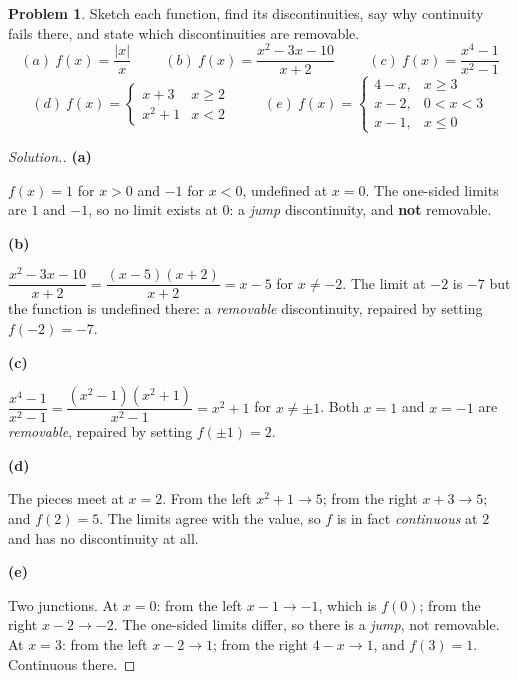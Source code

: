 \documentclass[11pt,a4paper]{article}
\theoremstyle{definition}
\newtheorem{problemx}{Problem}[subsection]
\newenvironment{problem}{\begin{problemx}}{\end{problemx}}
\newenvironment{solution}
  {\renewcommand{\qedsymbol}{}\begin{proof}[\textit{Solution}.]}
  {\end{proof}}
\newcommand{\subhead}[1]{%
  \par\medskip\noindent\textbf{#1}\par\nobreak\smallskip}
\begin{document}
\begin{problem}
Sketch each function, find its discontinuities, say why continuity fails there,
and state which discontinuities are removable.
$$(a)\ f(x) = \frac{\left|x\right|}{x}\hspace{1cm}
(b)\ f(x) = \frac{x^2-3x-10}{x+2}\hspace{1cm}
(c)\ f(x) = \frac{x^4-1}{x^2-1}$$
$$(d)\ f(x) = \begin{cases} x+3 & x\geq 2\\ x^2+1 & x<2\end{cases}
\hspace{1cm}
(e)\ f(x) = \begin{cases} 4-x, & x\geq 3\\ x-2, & 0<x<3\\ x-1, & x\leq 0\end{cases}$$
\end{problem}
\begin{solution}
\subhead{(a)}
$f(x) = 1$ for $x>0$ and $-1$ for $x<0$, undefined at $x=0$. The one-sided
limits are $1$ and $-1$, so no limit exists at $0$: a \emph{jump}
discontinuity, and \textbf{not} removable.

\subhead{(b)}
$\dfrac{x^2-3x-10}{x+2} = \dfrac{(x-5)(x+2)}{x+2} = x-5$ for $x\neq -2$. The
limit at $-2$ is $-7$ but the function is undefined there: a \emph{removable}
discontinuity, repaired by setting $f(-2) = -7$.

\subhead{(c)}
$\dfrac{x^4-1}{x^2-1} = \dfrac{(x^2-1)(x^2+1)}{x^2-1} = x^2+1$ for
$x\neq\pm 1$. Both $x=1$ and $x=-1$ are \emph{removable}, repaired by setting
$f(\pm 1) = 2$.

\subhead{(d)}
The pieces meet at $x=2$. From the left $x^2+1\rightarrow 5$; from the right
$x+3\rightarrow 5$; and $f(2) = 5$. The limits agree with the value, so $f$ is
in fact \emph{continuous} at $2$ and has no discontinuity at all.

\subhead{(e)}
Two junctions. At $x=0$: from the left $x-1\rightarrow -1$, which is $f(0)$;
from the right $x-2\rightarrow -2$. The one-sided limits differ, so there is a
\emph{jump}, not removable. At $x=3$: from the left $x-2\rightarrow 1$; from the
right $4-x\rightarrow 1$, and $f(3) = 1$. Continuous there.
\end{solution}
\end{document}
